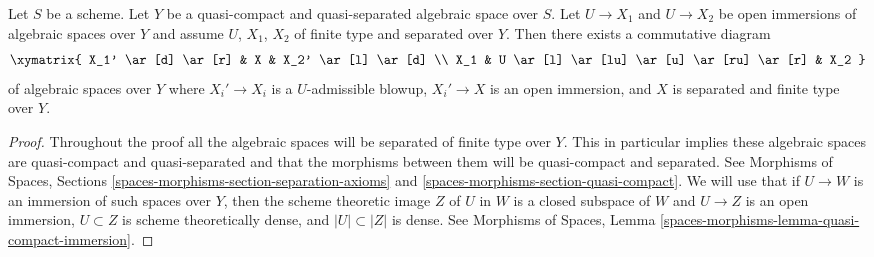\begin{lemma}
\label{lemma-find-common-blowups}
Let $S$ be a scheme. Let $Y$ be a quasi-compact and quasi-separated
algebraic space over $S$. Let $U \to X_1$ and $U \to X_2$ be open immersions
of algebraic spaces over $Y$ and assume $U$, $X_1$, $X_2$ of finite
type and separated over $Y$. Then there exists a commutative diagram
$$
\xymatrix{
X_1' \ar[d] \ar[r] & X & X_2' \ar[l] \ar[d] \\
X_1 & U \ar[l] \ar[lu] \ar[u] \ar[ru] \ar[r] & X_2
}
$$
of algebraic spaces over $Y$ where $X_i' \to X_i$ is a $U$-admissible
blowup, $X_i' \to X$ is an open immersion, and $X$ is separated and finite
type over $Y$.
\end{lemma}

\begin{proof}
Throughout the proof all the algebraic spaces will be separated of finite
type over $Y$. This in particular implies these algebraic spaces are
quasi-compact and quasi-separated and that the morphisms between them
will be quasi-compact and separated. See
Morphisms of Spaces, Sections
\ref{spaces-morphisms-section-separation-axioms} and
\ref{spaces-morphisms-section-quasi-compact}.
We will use that if $U \to W$ is an immersion of such spaces over $Y$,
then the scheme theoretic image $Z$ of $U$ in $W$ is a closed subspace
of $W$ and $U \to Z$ is an open immersion, $U \subset Z$ is scheme
theoretically dense, and $|U| \subset |Z|$ is dense. See
Morphisms of Spaces, Lemma
\ref{spaces-morphisms-lemma-quasi-compact-immersion}.


\end{proof}
